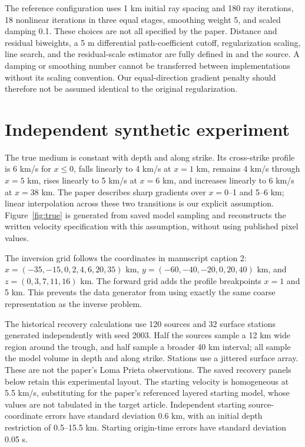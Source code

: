 \documentclass[11pt]{article}
\begin{document}
The reference configuration uses 1 km initial ray spacing and 180 ray
iterations, 18 nonlinear iterations in three equal stages, smoothing weight
5, and scaled damping 0.1. These choices are not all specified by the paper.
Distance and residual biweights, a 5 m differential path-coefficient cutoff,
regularization scaling, line search, and the residual-scale estimator are
fully defined in  and the source. A damping or smoothing
number cannot be transferred between implementations without its scaling
convention. Our equal-direction gradient penalty should therefore not be
assumed identical to the original regularization.

\section{Independent synthetic experiment}
The true medium is constant with depth and along strike. Its cross-strike
profile is 6 km/s for $x\leq0$, falls linearly to 4 km/s at $x=1$ km,
remains 4 km/s through $x=5$ km, rises linearly to 5 km/s at $x=6$ km,
and increases linearly to 6 km/s at $x=38$ km. The paper describes sharp
gradients over $x=0$--1 and 5--6 km; linear interpolation across these two
transitions is our explicit assumption. Figure~\ref{fig:true} is generated
from saved model sampling and reconstructs the written velocity specification
with this assumption, without using published pixel values.

The inversion grid follows the coordinates in manuscript caption 2:
$x=(-35,-15,0,2,4,6,20,35)$ km,
$y=(-60,-40,-20,0,20,40)$ km, and
$z=(0,3,7,11,16)$ km. The forward grid adds the profile breakpoints
$x=1$ and 5 km. This prevents the data generator from using exactly the
same coarse representation as the inverse problem.

The historical recovery calculations use 120 sources and 32 surface stations
generated independently with seed
2003. Half the sources sample a 12 km wide region around the trough, and
half sample a broader 40 km interval; all sample the model volume in depth
and along strike. Stations use a jittered surface array. These are not the
paper's Loma Prieta observations. The saved recovery panels below retain
this experimental layout. The starting velocity is homogeneous at 5.5 km/s,
substituting for the paper's referenced layered starting model, whose values
are not tabulated in the target article. Independent starting source-coordinate
errors have standard deviation 0.6 km, with an initial depth restriction
of 0.5--15.5 km. Starting origin-time errors have standard deviation 0.05 s.
\end{document}
